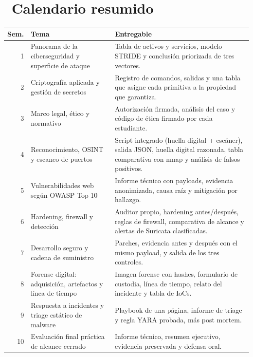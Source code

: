 \documentclass[11pt,a4paper]{article}
\newcommand{\iconotexto}[2]{\textcolor{cyanNeon}{\faIcon{#1}}~#2}
\begin{document}
\section{\iconotexto{calendar-alt}{Calendario resumido}}

\begin{tabularx}{\linewidth}{@{}r p{4.1cm} X@{}}
\toprule
Sem. & Tema & Entregable\\
\midrule
1 & Panorama de la ciberseguridad y superficie de ataque & Tabla de activos y servicios, modelo STRIDE y conclusión priorizada de tres vectores. \\
2 & Criptografía aplicada y gestión de secretos & Registro de comandos, salidas y una tabla que asigne cada primitiva a la propiedad que garantiza. \\
3 & Marco legal, ético y normativo & Autorización firmada, análisis del caso y código de ética firmado por cada estudiante. \\
4 & Reconocimiento, OSINT y escaneo de puertos & Script integrado (huella digital + escáner), salida JSON, huella digital razonada, tabla comparativa con nmap y análisis de falsos positivos. \\
5 & Vulnerabilidades web según OWASP Top 10 & Informe técnico con payloads, evidencia anonimizada, causa raíz y mitigación por hallazgo. \\
6 & Hardening, firewall y detección & Auditor propio, hardening antes/después, reglas de firewall, comparativa de alcance y alertas de Suricata clasificadas. \\
7 & Desarrollo seguro y cadena de suministro & Parches, evidencia antes y después con el mismo payload, y salida de los tres controles. \\
8 & Forense digital: adquisición, artefactos y línea de tiempo & Imagen forense con hashes, formulario de custodia, línea de tiempo, relato del incidente y tabla de IoCs. \\
9 & Respuesta a incidentes y triage estático de malware & Playbook de una página, informe de triage y regla YARA probada, más post mortem. \\
10 & Evaluación final práctica de alcance cerrado & Informe técnico, resumen ejecutivo, evidencia preservada y defensa oral. \\
\bottomrule
\end{tabularx}
\end{document}
